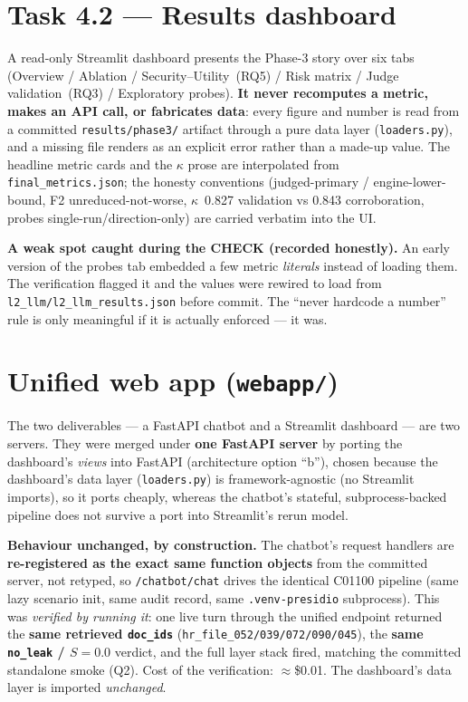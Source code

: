 \documentclass[11pt,a4paper]{article}
\newcommand{\kpa}{\ensuremath{\kappa}}
\begin{document}
\section{Task 4.2 --- Results dashboard}

A read-only Streamlit dashboard presents the Phase-3 story over six tabs (Overview / Ablation /
Security--Utility~(RQ5) / Risk matrix / Judge validation~(RQ3) / Exploratory probes). \textbf{It never
recomputes a metric, makes an API call, or fabricates data}: every figure and number is read from a
committed \texttt{results/phase3/} artifact through a pure data layer (\texttt{loaders.py}), and a
missing file renders as an explicit error rather than a made-up value. The headline metric cards and
the \kpa{} prose are interpolated from \texttt{final\_metrics.json}; the honesty conventions
(judged-primary / engine-lower-bound, F2 unreduced-not-worse, \kpa{}~0.827 validation vs 0.843
corroboration, probes single-run/direction-only) are carried verbatim into the UI.

\begin{keyfinding}
\textbf{A weak spot caught during the CHECK (recorded honestly).} An early version of the probes tab
embedded a few metric \emph{literals} instead of loading them. The verification flagged it and the
values were rewired to load from \texttt{l2\_llm/l2\_llm\_results.json} before commit. The
``never hardcode a number'' rule is only meaningful if it is actually enforced --- it was.
\end{keyfinding}

\section{Unified web app (\texttt{webapp/})}

The two deliverables --- a FastAPI chatbot and a Streamlit dashboard --- are two servers. They were
merged under \textbf{one FastAPI server} by porting the dashboard's \emph{views} into FastAPI
(architecture option ``b''), chosen because the dashboard's data layer (\texttt{loaders.py}) is
framework-agnostic (no Streamlit imports), so it ports cheaply, whereas the chatbot's stateful,
subprocess-backed pipeline does not survive a port into Streamlit's rerun model.

\noindent\textbf{Behaviour unchanged, by construction.} The chatbot's request handlers are
\textbf{re-registered as the exact same function objects} from the committed server, not retyped, so
\texttt{/chatbot/chat} drives the identical C01100 pipeline (same lazy scenario init, same audit
record, same \texttt{.venv-presidio} subprocess). This was \emph{verified by running it}: one live
turn through the unified endpoint returned the \textbf{same retrieved \texttt{doc\_ids}}
(\texttt{hr\_file\_052/039/072/090/045}), the \textbf{same \texttt{no\_leak} / $S=0.0$} verdict, and
the full layer stack fired, matching the committed standalone smoke (Q2). Cost of the verification:
$\approx$\$0.01. The dashboard's data layer is imported \emph{unchanged}.
\end{document}
